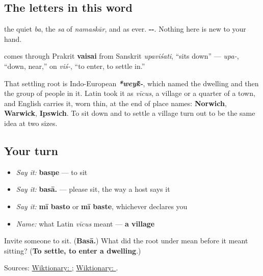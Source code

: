 \subsection*{The letters in this word}
\textbf{} the quiet \emph{ba}, \textbf{} the \emph{sa} of \emph{namaskār}, and \textbf{} as ever. \textbf{--}. Nothing here is new to your hand.

\begin{cousinweb}
\textbf{} comes through Prakrit \textbf{vaisai} from Sanskrit \textbf{} \emph{upaviśati}, \textquotedblleft{}sits down\textquotedblright{} — \textbf{} \emph{upa-}, \textquotedblleft{}down, near,\textquotedblright{} on \textbf{} \emph{viś-}, \textquotedblleft{}to enter, to settle in.\textquotedblright{}

That settling root is Indo-European \emph{\textbf{*wey\'{k}-}}, which named the dwelling and then the group of people in it. Latin took it as \emph{vīcus}, a village or a quarter of a town, and English carries it, worn thin, at the end of place names: \textbf{Norwich}, \textbf{Warwick}, \textbf{Ipswich}. To sit down and to settle a village turn out to be the same idea at two sizes.
\end{cousinweb}

\subsection*{Your turn}
\begin{itemize}
\raggedright
  \item \emph{Say it:} \textbf{basṇe} — to sit
  \item \emph{Say it:} \textbf{basā.} — please sit, the way a host says it
  \item \emph{Say it:} \textbf{mī basto} or \textbf{mī baste}, whichever declares you
  \item \emph{Name:} what Latin \emph{vīcus} meant — \textbf{a village}
\end{itemize}

\begin{tcolorbox}[breakable,colback=teal!4,colframe=teal!35!black,title={Before you move on}]
Invite someone to sit. (\textbf{Basā.}) What did the root under \textbf{} mean before it meant sitting? (\textbf{To settle, to enter a dwelling}.)

Sources: \href{https://en.wiktionary.org/wiki/\%E0\%A4\%AC\%E0\%A4\%B8\%E0\%A4\%A3\%E0\%A5\%87}{Wiktionary: }; \href{https://en.wiktionary.org/wiki/\%E0\%A4\%B5\%E0\%A4\%BF\%E0\%A4\%B6\%E0\%A5\%8D}{Wiktionary: }.
\end{tcolorbox}
